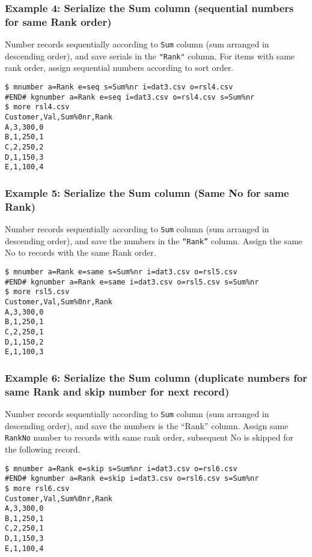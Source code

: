 \subsubsection*{Example 4: Serialize the Sum column (sequential numbers for same Rank order)}

Number records sequentially according to \verb|Sum| column (sum arranged in descending order), and save serials in the \verb|"Rank"| column. For items with same rank order, assign sequential numbers according to sort order.


\begin{Verbatim}[baselinestretch=0.7,frame=single]
$ mnumber a=Rank e=seq s=Sum%nr i=dat3.csv o=rsl4.csv
#END# kgnumber a=Rank e=seq i=dat3.csv o=rsl4.csv s=Sum%nr
$ more rsl4.csv
Customer,Val,Sum%0nr,Rank
A,3,300,0
B,1,250,1
C,2,250,2
D,1,150,3
E,1,100,4
\end{Verbatim}
\subsubsection*{Example 5: Serialize the Sum column (Same No for same Rank)}

Number records sequentially according to \verb|Sum| column (sum arranged in descending order), and save the numbers in the \verb|“Rank”| column. Assign the same No to records with the same Rank order.


\begin{Verbatim}[baselinestretch=0.7,frame=single]
$ mnumber a=Rank e=same s=Sum%nr i=dat3.csv o=rsl5.csv
#END# kgnumber a=Rank e=same i=dat3.csv o=rsl5.csv s=Sum%nr
$ more rsl5.csv
Customer,Val,Sum%0nr,Rank
A,3,300,0
B,1,250,1
C,2,250,1
D,1,150,2
E,1,100,3
\end{Verbatim}
\subsubsection*{Example 6: Serialize the Sum column (duplicate numbers for same Rank and skip number for next record)}

Number records sequentially according to \verb|Sum| column (sum arranged in descending order), and save the numbers is the “Rank” column. Assign same \verb|RankNo| number to records with same rank order, subsequent No is skipped for the following record.


\begin{Verbatim}[baselinestretch=0.7,frame=single]
$ mnumber a=Rank e=skip s=Sum%nr i=dat3.csv o=rsl6.csv
#END# kgnumber a=Rank e=skip i=dat3.csv o=rsl6.csv s=Sum%nr
$ more rsl6.csv
Customer,Val,Sum%0nr,Rank
A,3,300,0
B,1,250,1
C,2,250,1
D,1,150,3
E,1,100,4
\end{Verbatim}
